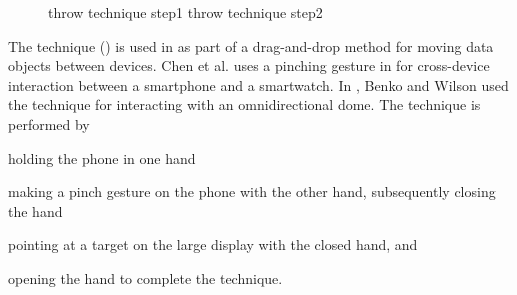 \begin{figure}
\hspace{0.02\columnwidth} 
\caption{
	\protect{} throw technique step1 
	\protect{} throw technique step2
}
\label{fig:throwTechnique}
\end{figure}

The \pinch technique () is used in \cite{Ikematsu:2015} as part of a drag-and-drop method for moving data objects between devices.
Chen et al. uses a pinching gesture in \cite{Chen:2014} for cross-device interaction between a smartphone and a smartwatch. 
In \cite{Benko:2010}, Benko and Wilson used the \pinch technique for interacting with an omnidirectional dome.
The \pinch technique is performed by 
\begin{enumerate*}[label=\itshape\arabic*\upshape)]
	\item{holding the phone in one hand} 
	\item{making a pinch gesture on the phone with the other hand, subsequently closing the hand}
	\item{pointing at a target on the large display with the closed hand, and}
	\item{opening the hand to complete the technique.}
\end{enumerate*}

